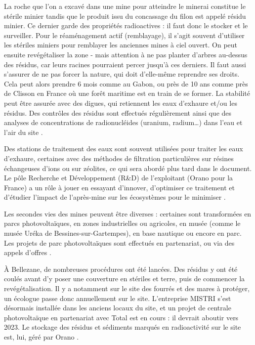\documentclass{article}
\begin{document}
La roche que l’on a excavé dans une mine pour atteindre le minerai constitue le stérile minier tandis que le produit issu du concassage du filon est appelé résidu minier. Ce dernier garde des propriétés radioactives : il faut donc le stocker et le surveiller.
Pour le réaménagement actif (remblayage), il s’agit souvent d’utiliser les stériles miniers pour remblayer les anciennes mines à ciel ouvert. On peut ensuite revégétaliser la zone - mais attention à ne pas planter d’arbres au-dessus des résidus, car leurs racines pourraient percer jusqu’à ces derniers. Il faut aussi s’assurer de ne pas forcer la nature, qui doit d’elle-même reprendre ses droits. Cela peut alors prendre 6 mois comme au Gabon, ou près de 10 ans comme près de Clisson en France où une forêt maritime est en train de se former. La stabilité peut être assurée avec des digues, qui retiennent les eaux d’exhaure et/ou les résidus. Des contrôles des résidus sont effectués régulièrement ainsi que des analyses de concentrations de radionucléides (uranium, radium…) dans l’eau et l’air du site \cite{himeur_apres-mine_2020}.

Des stations de traitement des eaux sont souvent utilisées pour traiter les eaux d’exhaure, certaines avec des méthodes de filtration particulières sur résines échangeuses d’ions ou sur zéolites, ce qui sera abordé plus tard dans le document. Le pôle Recherche et Développement (R\&D) de l’exploitant (Orano pour la France) a un rôle à jouer en essayant d’innover, d’optimiser ce traitement et d’étudier l’impact de l’après-mine sur les écosystèmes pour le minimiser \cite{schick_les_2020}.

Les secondes vies des mines peuvent être diverses : certaines sont transformées en parcs photovoltaïques, en zones industrielles ou agricoles, en musée (comme le musée Uréka de Bessines-sur-Gartempes), en base nautique ou encore en parc.
Les projets de parc photovoltaïques sont effectués en partenariat, ou via des appels d’offres  \cite{himeur_apres-mine_2020}.

À Bellezane, de nombreuses procédures ont été lancées. Des résidus y ont été coulés avant d’y poser une couverture en stériles et terre, puis de commencer la revégétalisation. Il y a notamment sur le site des fourrés et des mares à protéger, un écologue passe donc annuellement sur le site. L’entreprise MISTRI s’est désormais installée dans les anciens locaux du site, et un projet de centrale photovoltaïque en partenariat avec Total est en cours : il devrait aboutir vers 2023. Le stockage des résidus et sédiments marqués en radioactivité sur le site est, lui, géré par Orano \cite{benesteau_site_2020}.
\end{document}
